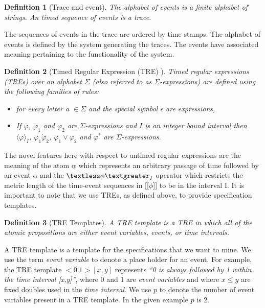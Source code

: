 \documentclass[]{sigplanconf}
\begin{document}
\newtheorem{defns}{Definition}

\begin{defns}[Trace and event]
The alphabet of events is a finite alphabet of strings. An timed sequence of events is a trace.
\end{defns}

The sequences of events in the trace are ordered by time stamps.
The alphabet of events is defined by the system generating the traces. The events have associated meaning pertaining to the functionality of the system.


\begin{defns}[Timed Regular Expression (TRE) \cite{timedregex}]
Timed regular expressions (TREs) over an alphabet $\Sigma$ (also referred to as $\Sigma$-expressions) are defined using the following families of rules:
\begin{itemize}
  \item  {} for every letter a $\in \Sigma$ and the special symbol $\epsilon$ are expressions,
  \item If $\varphi$, $\varphi_1$ and $\varphi_2$ are $\Sigma$-expressions and $I$ is an integer bound interval then $\langle \varphi \rangle_I$, $\varphi_1 \dot \varphi_2$, $\varphi_1 \vee \varphi_2$ and $\varphi^*$ are $\Sigma$-expressions.
\end{itemize}
\end{defns}

The novel features here with respect to untimed regular expressions are the meaning of the atom $\underline{\alpha}$ which represents an arbitrary passage of time followed by an event $\alpha$ and the $\textless \phi \textgreater _I$ operator which restricts the metric length of the time-event sequences in [[$\phi$]] to be in the interval I. It is important to note that we use TREs, as defined above, to provide specification templates.


\begin{defns}[TRE Templates]
A TRE template is a TRE in which all of the atomic propositions are either event variables, events, or time intervals.
\end{defns}

A TRE template is a template for the specifications that we want to mine. We use the term \emph{event variable} to denote a place holder for an event. For example, the TRE template $<0.1>[x,y]$ represents \emph{``0 is always followed by 1 within the time interval [x,y]''}, where 0 and 1 are \emph{event variables} and where $x \le y$ are fixed doubles used in the \emph{time interval}. We use $p$ to denote the number of event variables present in a TRE template. In the given example $p$ is 2.
\end{document}
